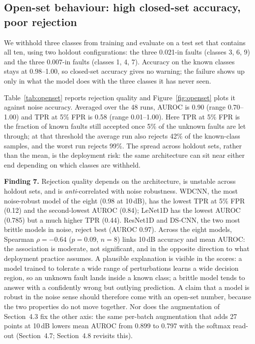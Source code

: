 \subsection{Open-set behaviour: high closed-set accuracy, poor rejection}
\label{sec:openset}

We withhold three classes from training and evaluate on a test set that contains all ten, using two holdout configurations: the three 0.021-in faults (classes 3, 6, 9) and the three 0.007-in faults (classes 1, 4, 7). Accuracy on the known classes stays at 0.98--1.00, so closed-set accuracy gives no warning; the failure shows up only in what the model does with the three classes it has never seen.

Table~\ref{tab:openset} reports rejection quality and Figure~\ref{fig:openset} plots it against noise accuracy. Averaged over the 48 runs, AUROC is 0.90 (range 0.70--1.00) and TPR at 5\% FPR is 0.58 (range 0.01--1.00). Here TPR at 5\% FPR is the fraction of known faults still accepted once 5\% of the unknown faults are let through; at that threshold the average run also rejects 42\% of the known-class samples, and the worst run rejects 99\%. The spread across holdout sets, rather than the mean, is the deployment risk: the same architecture can sit near either end depending on which classes are withheld.

\textbf{Finding 7.} Rejection quality depends on the architecture, is unstable across holdout sets, and is \emph{anti}-correlated with noise robustness. WDCNN, the most noise-robust model of the eight (0.98 at 10\,dB), has the lowest TPR at 5\% FPR (0.12) and the second-lowest AUROC (0.84); LeNet1D has the lowest AUROC (0.785) but a much higher TPR (0.44). ResNet1D and DS-CNN, the two most brittle models in noise, reject best (AUROC 0.97). Across the eight models, Spearman $\rho=-0.64$ ($p=0.09$, $n=8$) links 10\,dB accuracy and mean AUROC: the association is moderate, not significant, and in the opposite direction to what deployment practice assumes. A plausible explanation is visible in the scores: a model trained to tolerate a wide range of perturbations learns a wide decision region, so an unknown fault lands inside a known class; a brittle model tends to answer with a confidently wrong but outlying prediction. A claim that a model is robust in the noise sense should therefore come with an open-set number, because the two properties do not move together. Nor does the augmentation of Section~4.3 fix the other axis: the same per-batch augmentation that adds 27 points at 10\,dB lowers mean AUROC from 0.899 to 0.797 with the softmax read-out (Section~4.7; Section~4.8 revisits this).

